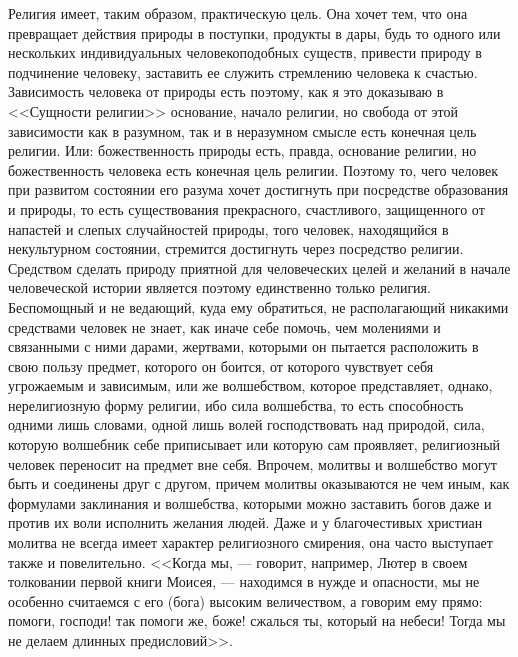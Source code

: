\documentclass[12pt]{article}
\begin{document}
Религия имеет, таким образом, практическую цель. Она хочет тем, что она превращает действия природы в поступки, продукты в дары, будь то одного или нескольких индивидуальных человекоподобных существ, привести природу в подчинение человеку, заставить ее служить стремлению человека к счастью. Зависимость человека от природы есть поэтому, как я это доказываю в <<Сущности религии>>  основание, начало религии, но свобода от этой зависимости как в разумном, так и в неразумном смысле есть конечная цель религии. Или: божественность природы есть, правда, основание религии, но божественность человека есть конечная цель религии. Поэтому то, чего человек при развитом состоянии его разума хочет достигнуть при посредстве образования и природы, то есть существования прекрасного, счастливого, защищенного от напастей и слепых случайностей природы, того человек, находящийся в некультурном состоянии, стремится достигнуть через посредство религии. Средством сделать природу приятной для человеческих целей и желаний в начале человеческой истории является поэтому единственно только религия. Беспомощный и не ведающий, куда ему обратиться, не располагающий никакими средствами человек не знает, как иначе себе помочь, чем молениями и связанными с ними дарами, жертвами, которыми он пытается расположить в свою пользу предмет, которого он боится, от которого чувствует себя угрожаемым и зависимым, или же волшебством, которое представляет, однако, нерелигиозную форму религии, ибо сила волшебства, то есть способность одними лишь словами, одной лишь волей господствовать над природой, сила, которую волшебник себе приписывает или которую сам проявляет, религиозный человек переносит на предмет вне себя. Впрочем, молитвы и волшебство могут быть и соединены друг с другом, причем молитвы оказываются не чем иным, как формулами заклинания и волшебства, которыми можно заставить богов даже и против их воли исполнить желания людей. Даже и у благочестивых христиан молитва не всегда имеет характер религиозного смирения, она часто выступает также и повелительно. <<Когда мы, --- говорит, например, Лютер в своем толковании первой книги Моисея, --- находимся в нужде и опасности, мы не особенно считаемся с его (бога) высоким величеством, а говорим ему прямо: помоги, господи! так помоги же, боже! сжалься ты, который на небеси! Тогда мы не делаем длинных предисловий>>. 
\end{document}
